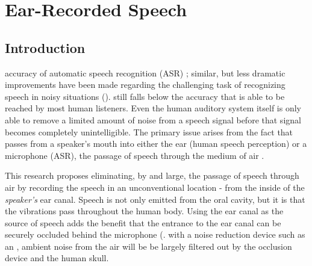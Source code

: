  





\chapter{Ear-Recorded Speech\label{chapter2}}


\section{Introduction}

\DIFdelbegin {}\DIFdelend \DIFaddbegin {}\DIFaddend accuracy of automatic speech recognition (ASR) \DIFaddbegin {}\DIFaddend ; similar, but less dramatic improvements have been made regarding the challenging task of recognizing speech in noisy situations (\cite{zhang:17}).  \DIFdelbegin {}\DIFdelend \DIFaddbegin {}\DIFaddend still falls below the accuracy that is able to be reached by most human listeners.  Even the human auditory system itself \DIFdelbegin {}\DIFdelend is only able to remove a limited amount of noise from a speech signal before that signal becomes completely unintelligible.  The primary issue arises from the fact that \DIFdelbegin {}\DIFdelend \DIFaddbegin {}\DIFaddend passes from a speaker's mouth into either the ear (human speech perception) or a microphone (ASR), \DIFdelbegin {}\DIFdelend \DIFaddbegin {}\DIFaddend the passage of speech through the medium of air \DIFaddbegin {}\DIFaddend .  

This research proposes eliminating, by and large, the passage of speech through air by recording the speech in an unconventional location - from the inside of the \textit{speaker's} ear canal.  Speech is not only emitted from the oral cavity, but it is \DIFdelbegin {}\DIFdelend \DIFaddbegin {}\DIFaddend that the vibrations pass throughout the human body.  Using the ear canal as the source of speech adds the benefit that the entrance to the ear canal can be securely occluded behind the microphone (\DIFdelbegin {}\DIFdelend \DIFaddbegin {}\DIFaddend . with a noise reduction device such as an \DIFdelbegin {}\DIFdelend \DIFaddbegin {}\DIFaddend , ambient noise from the air will be be largely filtered out by the occlusion device and the human skull.

